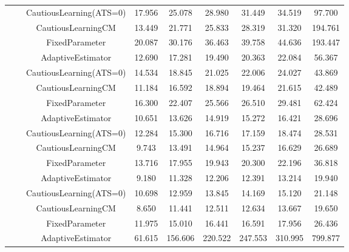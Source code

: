 \begin{table}[!h]
\begin{tabular}[t]{ccccccccc}
 &  & CautiousLearning(ATS=0) & 17.956 & 25.078 & 28.980 & 31.449 & 34.519 & 97.700\\

 &  & CautiousLearningCM & 13.449 & 21.771 & 25.833 & 28.319 & 31.320 & 194.761\\

 & \multirow[t]{-4}{*}{\centering\arraybackslash 0.75} & FixedParameter & 20.087 & 30.176 & 36.463 & 39.758 & 44.636 & 193.447\\
\cmidrule{2-9}
 &  & AdaptiveEstimator & 12.690 & 17.281 & 19.490 & 20.363 & 22.084 & 56.367\\

 &  & CautiousLearning(ATS=0) & 14.534 & 18.845 & 21.025 & 22.006 & 24.027 & 43.869\\

 &  & CautiousLearningCM & 11.184 & 16.592 & 18.894 & 19.464 & 21.615 & 42.489\\

 & \multirow[t]{-4}{*}{\centering\arraybackslash 1.00} & FixedParameter & 16.300 & 22.407 & 25.566 & 26.510 & 29.481 & 62.424\\
\cmidrule{2-9}
 &  & AdaptiveEstimator & 10.651 & 13.626 & 14.919 & 15.272 & 16.421 & 28.696\\

 &  & CautiousLearning(ATS=0) & 12.284 & 15.300 & 16.716 & 17.159 & 18.474 & 28.531\\

 &  & CautiousLearningCM & 9.743 & 13.491 & 14.964 & 15.237 & 16.629 & 26.689\\

 & \multirow[t]{-4}{*}{\centering\arraybackslash 1.25} & FixedParameter & 13.716 & 17.955 & 19.943 & 20.300 & 22.196 & 36.818\\
\cmidrule{2-9}
 &  & AdaptiveEstimator & 9.180 & 11.328 & 12.206 & 12.391 & 13.214 & 19.940\\

 &  & CautiousLearning(ATS=0) & 10.698 & 12.959 & 13.845 & 14.169 & 15.120 & 21.148\\

 &  & CautiousLearningCM & 8.650 & 11.441 & 12.511 & 12.634 & 13.667 & 19.650\\

\multirow[t]{-28}{*}{\centering\arraybackslash 1} & \multirow[t]{-4}{*}{\centering\arraybackslash 1.50} & FixedParameter & 11.975 & 15.010 & 16.441 & 16.591 & 17.956 & 26.436\\
\cmidrule{1-9}
 &  & AdaptiveEstimator & 61.615 & 156.606 & 220.522 & 247.553 & 310.995 & 799.877\\


\end{tabular}
\end{table}
